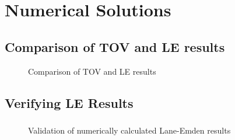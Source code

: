 \section{Numerical Solutions}

\subsection{Comparison of TOV and LE results}




\begin{frame}
	\begin{figure}
		\centering
		\caption{Comparison of TOV and LE results}
	\end{figure}
\end{frame}

\subsection{Verifying LE Results}
\begin{frame}
	\frametitle{\insertsubsection}
	\begin{figure}
		\centering
		\caption{Validation of numerically calculated Lane-Emden results}
	\end{figure}
\end{frame}

